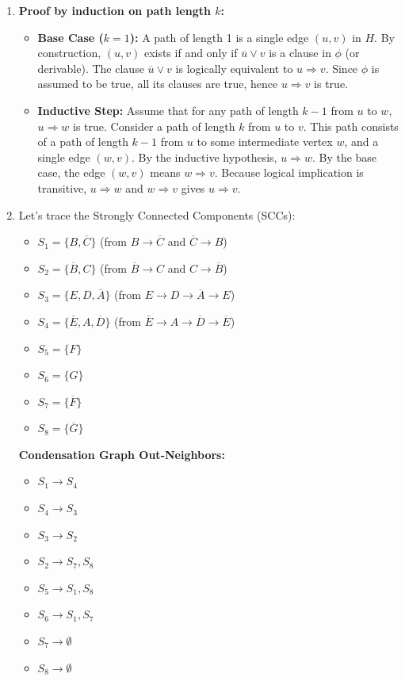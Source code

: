 \documentclass[11pt]{article}
\begin{document}
\begin{enumerate}[label=\textbf{(\alph*)}]
    \item \textbf{Proof by induction on path length $k$:}
    \begin{itemize}
        \item \textbf{Base Case ($k=1$):} A path of length 1 is a single edge $(u, v)$ in $H$. By construction, $(u, v)$ exists if and only if $\overline{u} \lor v$ is a clause in $\phi$ (or derivable). The clause $\overline{u} \lor v$ is logically equivalent to $u \Rightarrow v$. Since $\phi$ is assumed to be true, all its clauses are true, hence $u \Rightarrow v$ is true.
        \item \textbf{Inductive Step:} Assume that for any path of length $k-1$ from $u$ to $w$, $u \Rightarrow w$ is true. Consider a path of length $k$ from $u$ to $v$. This path consists of a path of length $k-1$ from $u$ to some intermediate vertex $w$, and a single edge $(w, v)$. 
        By the inductive hypothesis, $u \Rightarrow w$. By the base case, the edge $(w, v)$ means $w \Rightarrow v$. Because logical implication is transitive, $u \Rightarrow w$ and $w \Rightarrow v$ gives $u \Rightarrow v$.
    \end{itemize}

    \item Let's trace the Strongly Connected Components (SCCs):
    \begin{itemize}
        \item $S_1 = \{B, \overline{C}\}$ (from $B \to \overline{C}$ and $\overline{C} \to B$)
        \item $S_2 = \{\overline{B}, C\}$ (from $\overline{B} \to C$ and $C \to \overline{B}$)
        \item $S_3 = \{E, D, \overline{A}\}$ (from $E \to D \to \overline{A} \to E$)
        \item $S_4 = \{\overline{E}, A, \overline{D}\}$ (from $\overline{E} \to A \to \overline{D} \to \overline{E}$)
        \item $S_5 = \{F\}$
        \item $S_6 = \{G\}$
        \item $S_7 = \{\overline{F}\}$
        \item $S_8 = \{\overline{G}\}$
    \end{itemize}
    \textbf{Condensation Graph Out-Neighbors:}
    \begin{itemize}
        \item $S_1 \to S_4$
        \item $S_4 \to S_3$
        \item $S_3 \to S_2$
        \item $S_2 \to S_7, S_8$
        \item $S_5 \to S_1, S_8$
        \item $S_6 \to S_1, S_7$
        \item $S_7 \to \emptyset$
        \item $S_8 \to \emptyset$
    \end{itemize}


\end{enumerate}
\end{document}
